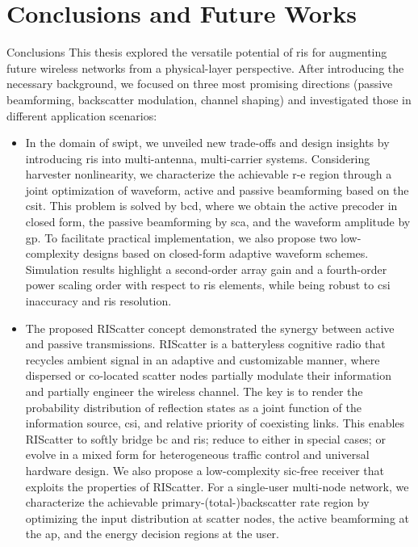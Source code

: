 
\chapter{Conclusions and Future Works}\label{ch:conclusions}

\begin{section}{Conclusions}
	This thesis explored the versatile potential of \gls{ris} for augmenting future wireless networks from a physical-layer perspective.
	After introducing the necessary background, we focused on three most promising directions (passive beamforming, backscatter modulation, channel shaping) and investigated those in different application scenarios:
	\begin{itemize}
		\item In the domain of \gls{swipt}, we unveiled new trade-offs and design insights by introducing \gls{ris} into multi-antenna, multi-carrier systems. Considering harvester nonlinearity, we characterize the achievable \gls{r-e} region through a joint optimization of waveform, active and passive beamforming based on the \gls{csit}. This problem is solved by \gls{bcd}, where we obtain the active precoder in closed form, the passive beamforming by \gls{sca}, and the waveform amplitude by \gls{gp}. To facilitate practical implementation, we also propose two low-complexity designs based on closed-form adaptive waveform schemes. Simulation results highlight a second-order array gain and a fourth-order power scaling order with respect to \gls{ris} elements, while being robust to \gls{csi} inaccuracy and \gls{ris} resolution.
		\item The proposed RIScatter concept demonstrated the synergy between active and passive transmissions. RIScatter is a batteryless cognitive radio that recycles ambient signal in an adaptive and customizable manner, where dispersed or co-located scatter nodes partially modulate their information and partially engineer the wireless channel.
		The key is to render the probability distribution of reflection states as a joint function of the information source, \gls{csi}, and relative priority of coexisting links.
		This enables RIScatter to softly bridge \gls{bc} and \gls{ris}; reduce to either in special cases; or evolve in a mixed form for heterogeneous traffic control and universal hardware design.
		We also propose a low-complexity \gls{sic}-free receiver that exploits the properties of RIScatter.
		For a single-user multi-node network, we characterize the achievable primary-(total-)backscatter rate region by optimizing the input distribution at scatter nodes, the active beamforming at the \gls{ap}, and the energy decision regions at the user.

\end{itemize}
\end{section}
